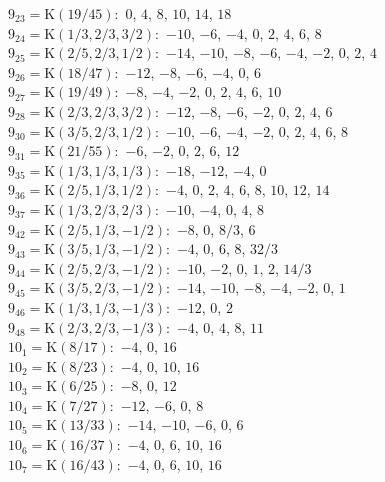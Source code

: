$9_{23} = \mathrm{K}(19/45):$  $0$, $4$, $8$, $10$, $14$, $18$\\ 
$9_{24} = \mathrm{K}(1/3, 2/3, 3/2):$  $-10$, $-6$, $-4$, $0$, $2$, $4$, $6$, $8$\\ 
$9_{25} = \mathrm{K}(2/5, 2/3, 1/2):$  $-14$, $-10$, $-8$, $-6$, $-4$, $-2$, $0$, $2$, $4$\\ 
$9_{26} = \mathrm{K}(18/47):$  $-12$, $-8$, $-6$, $-4$, $0$, $6$\\ 
$9_{27} = \mathrm{K}(19/49):$  $-8$, $-4$, $-2$, $0$, $2$, $4$, $6$, $10$\\ 
$9_{28} = \mathrm{K}(2/3, 2/3, 3/2):$  $-12$, $-8$, $-6$, $-2$, $0$, $2$, $4$, $6$\\ 
$9_{30} = \mathrm{K}(3/5, 2/3, 1/2):$  $-10$, $-6$, $-4$, $-2$, $0$, $2$, $4$, $6$, $8$\\ 
$9_{31} = \mathrm{K}(21/55):$  $-6$, $-2$, $0$, $2$, $6$, $12$\\ 
$9_{35} = \mathrm{K}(1/3, 1/3, 1/3):$  $-18$, $-12$, $-4$, $0$\\ 
$9_{36} = \mathrm{K}(2/5, 1/3, 1/2):$  $-4$, $0$, $2$, $4$, $6$, $8$, $10$, $12$, $14$\\ 
$9_{37} = \mathrm{K}(1/3, 2/3, 2/3):$  $-10$, $-4$, $0$, $4$, $8$\\ 
$9_{42} = \mathrm{K}(2/5, 1/3, -1/2):$  $-8$, $0$, $8/3$, $6$\\ 
$9_{43} = \mathrm{K}(3/5, 1/3, -1/2):$  $-4$, $0$, $6$, $8$, $32/3$\\ 
$9_{44} = \mathrm{K}(2/5, 2/3, -1/2):$  $-10$, $-2$, $0$, $1$, $2$, $14/3$\\ 
$9_{45} = \mathrm{K}(3/5, 2/3, -1/2):$  $-14$, $-10$, $-8$, $-4$, $-2$, $0$, $1$\\ 
$9_{46} = \mathrm{K}(1/3, 1/3, -1/3):$  $-12$, $0$, $2$\\ 
$9_{48} = \mathrm{K}(2/3, 2/3, -1/3):$  $-4$, $0$, $4$, $8$, $11$\\ 
$10_{1} = \mathrm{K}(8/17):$  $-4$, $0$, $16$\\ 
$10_{2} = \mathrm{K}(8/23):$  $-4$, $0$, $10$, $16$\\ 
$10_{3} = \mathrm{K}(6/25):$  $-8$, $0$, $12$\\ 
$10_{4} = \mathrm{K}(7/27):$  $-12$, $-6$, $0$, $8$\\ 
$10_{5} = \mathrm{K}(13/33):$  $-14$, $-10$, $-6$, $0$, $6$\\ 
$10_{6} = \mathrm{K}(16/37):$  $-4$, $0$, $6$, $10$, $16$\\ 
$10_{7} = \mathrm{K}(16/43):$  $-4$, $0$, $6$, $10$, $16$\\ 
